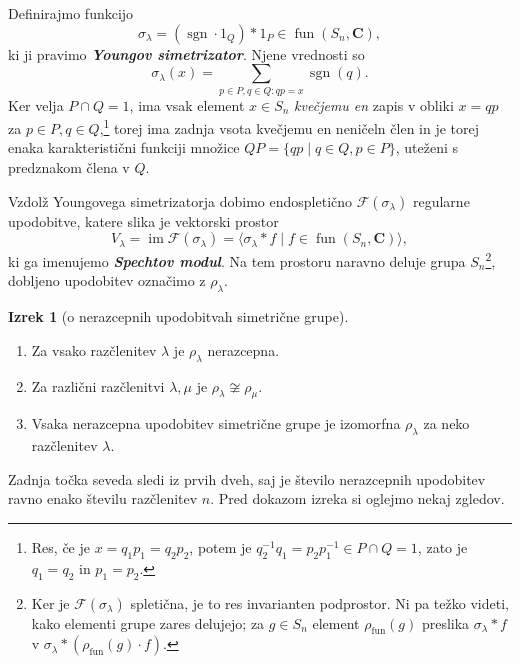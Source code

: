 \documentclass[11pt]{book}
\def\CC{\mathbf{C}}
\def\Fcal{\mathcal{F}}
\def\youngsym{\sigma_{\lambda}}
\DeclareMathOperator\image{im}
\DeclareMathOperator\sgn{sgn}
\DeclareMathOperator\fun{fun}
\def\definicija{\color{rdeca}\bf\em}
\theoremstyle{definition}
\theoremstyle{zgled}
\theoremstyle{odprtproblem}
\theoremstyle{domacanaloga}
\theoremstyle{izrek}
\newtheorem*{izrek}{Izrek}
\begin{document}
Definirajmo funkcijo
\[
    \youngsym = (\sgn \cdot 1_Q) * 1_P \in \fun(S_n, \CC),
\]
ki ji pravimo {\definicija Youngov simetrizator}. Njene vrednosti so
\[
    \youngsym(x) = \sum_{p \in P, q \in Q \colon qp = x} \sgn(q).
\]
Ker velja $P \cap Q = 1$, ima vsak element $x \in S_n$ \emph{kvečjemu en} zapis v obliki $x = qp$ za $p \in P, q \in Q$,\footnote{Res, če je $x = q_1 p_1 = q_2 p_2$, potem je $q_2^{-1} q_1 = p_2 p_1^{-1} \in P \cap Q = 1$, zato je $q_1 = q_2$ in $p_1 = p_2$.} torej ima zadnja vsota kvečjemu en neničeln člen in je torej enaka karakteristični funkciji množice $QP = \{ qp \mid q \in Q, p \in P \}$, uteženi s predznakom člena v $Q$.

Vzdolž Youngovega simetrizatorja dobimo endospletično $\Fcal(\youngsym)$ regularne upodobitve, katere slika je vektorski prostor
\[
    V_{\lambda} = \image \Fcal(\youngsym) = \langle \youngsym * f \mid f \in \fun(S_n, \CC) \rangle,
\]
ki ga imenujemo {\definicija Spechtov modul}. Na tem prostoru naravno deluje grupa $S_n$\footnote{Ker je $\Fcal(\youngsym)$ spletična, je to res invarianten podprostor. Ni pa težko videti, kako elementi grupe zares delujejo; za $g \in S_n$ element $\rho_{\fun}(g)$ preslika $\youngsym * f$ v $\youngsym * (\rho_{\fun}(g) \cdot f)$.}, dobljeno upodobitev označimo z $\rho_{\lambda}$.

\begin{izrek}[o nerazcepnih upodobitvah simetrične grupe] \leavevmode
\begin{enumerate}
    \item Za vsako razčlenitev $\lambda$ je $\rho_{\lambda}$ nerazcepna.
    \item Za različni razčlenitvi $\lambda, \mu$ je $\rho_{\lambda} \not\cong \rho_{\mu}$.
    \item Vsaka nerazcepna upodobitev simetrične grupe je izomorfna $\rho_{\lambda}$ za neko razčlenitev $\lambda$.
\end{enumerate}
\end{izrek}

Zadnja točka seveda sledi iz prvih dveh, saj je število nerazcepnih upodobitev ravno enako številu razčlenitev $n$. Pred dokazom izreka si oglejmo nekaj zgledov.
\end{document}
